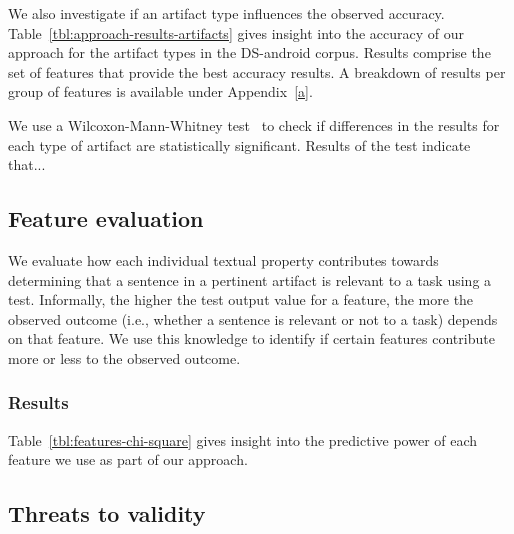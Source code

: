 We also investigate if an artifact type influences the observed accuracy. 
Table~\ref{tbl:approach-results-artifacts} gives insight into the accuracy of our approach for the artifact types in the \acs{DS-android} corpus. Results comprise the set of features 
that provide the best accuracy results. A breakdown of results per group of features is available under Appendix~\ref{a}.


We use a Wilcoxon-Mann-Whitney test~\cite{mannWhitneyU} to check if differences in the  results for each 
type of artifact are statistically significant. Results of the test indicate that... 




\subsection{Feature evaluation}


We evaluate how each individual textual property contributes towards determining 
that a sentence in a pertinent artifact is relevant to a task 
using a  test. 
Informally, the higher the test output value for a feature, the more the observed outcome (i.e., whether a sentence is relevant or not to a task) depends 
on that feature.
We use this knowledge to identify if certain features contribute more or less 
to the observed outcome.





\subsubsection{Results}



Table~\ref{tbl:features-chi-square} gives insight into the predictive power of each feature we use as part of our approach. 









\subsection{Threats to validity}


